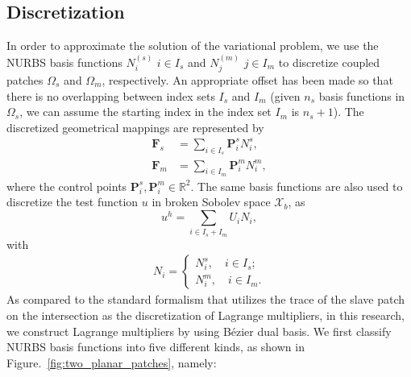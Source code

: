 \documentclass[preprint,12pt]{elsarticle}
\newcommand{\Bezier}{{B\'{e}zier} }
\begin{document}
\subsection{Discretization}
In order to approximate the solution of the variational problem, we use the NURBS basis functions $N^{(s)}_i$ $i\in{I_s}$ and $N^{(m)}_j$ $j\in{I_m}$ to discretize coupled patches $\Omega_s$ and $\Omega_m$, respectively. An appropriate offset has been made so that there is no overlapping between index sets $I_s$ and $I_m$ (given $n_s$ basis functions in $\Omega_s$, we can assume the starting index in the index set $I_m$ is $n_s+1$). The discretized geometrical mappings are represented by
\begin{align}
    \mathbf{F}_s&=\sum_{i\in{I_s}}\mathbf{P}_i^sN_i^s,\\
    \mathbf{F}_m&=\sum_{i\in{I_m}}\mathbf{P}_i^mN_i^m,
\end{align}
where the control points $\mathbf{P}_i^s,\mathbf{P}_i^m\in\mathbb{R}^2$. The same basis functions are also used to discretize the test function $u$ in broken Sobolev space $\mathcal{X}_b$, as
\begin{equation}
    u^h=\sum_{i\in{I_s+I_m}}U_iN_i,
\end{equation}
with
\begin{align}
    N_i=
    \begin{cases}
        N_i^s, \quad i\in{I_s};\\
        N_i^m, \quad i\in{I_m}.
    \end{cases}
\end{align}
As compared to the standard formalism that utilizes the trace of the slave patch on the intersection as the discretization of Lagrange multipliers, in this research, we construct Lagrange multipliers by using \Bezier dual basis. We first classify NURBS basis functions into five different kinds, as shown in Figure.~\ref{fig:two_planar_patches}, namely:
\end{document}

